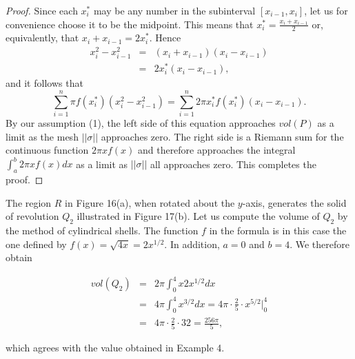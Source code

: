 \begin{proof}
Since each $x_i^*$ may be any number in the subinterval $[x_{i-1}, x_i]$, let us for convenience choose it to be the midpoint. This means that $x_i^* = \frac{x_i + x_{i-1}}{2}$ or, equivalently, that $x_i + x_{i-1} = 2x_i^*$. Hence
\begin{eqnarray*}
x_i^2 - x_{i - 1}^2 &=& (x_i + x_{i - 1})(x_i - x_{i - 1})\\
&=& 2x_i^*(x_i - x_{i-1}),
\end{eqnarray*}
and it follows that  
$$
\sum_{i=1}^n \pi f (x_i^*)(x_i^2 - x_{i-1}^2) = \sum_{i=1}^n 2\pi x_i^* f(x_i^*)(x_i - x_{i-1}) .  
$$
By our assumption (1), the left side of this equation approaches $vol(P)$ as a limit as the mesh $|| \sigma ||$ approaches zero. The right side is a Riemann sum for the continuous function $2\pi xf(x)$ and therefore approaches the integral $\int_a^b 2\pi xf(x) dx$ as a limit as $|| \sigma ||$ all approaches zero. This completes the proof.
\end{proof}

The region $R$ in Figure 16(a), when rotated about the $y$-axis, generates the solid of revolution $Q_2$ illustrated in Figure 17(b). Let us compute the volume of $Q_2$ by the method of cylindrical shells. The function $f$ in the formula is in this case the one defined by $f(x) = \sqrt{4x} = 2x^{1/2}$. In addition, $a = 0$ and $b = 4$. We therefore obtain

\begin{eqnarray*}
vol(Q_2) &=& 2\pi \int_0^4 x 2x^{1/2} dx \\
&=& 4\pi \int_0^4 x^{3/2} dx = 4 \pi \cdot \frac{2}{5} \cdot x^{5/2} \big|_0^4 \\
&=& 4 \pi \cdot \frac{2}{5} \cdot 32 = \frac{256 \pi}{5} ,
\end{eqnarray*}

\noindent which agrees with the value obtained in Example 4.  



